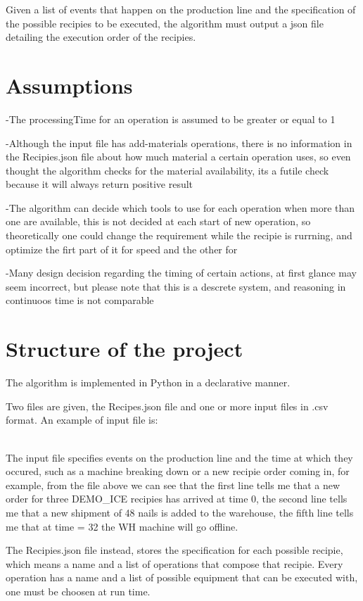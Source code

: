 \documentclass[12pt]{article}
\begin{document}
Given a list of events that happen on the production line and the specification of the possible recipies to be executed, the algorithm must output a json file detailing the execution order of the recipies.

\section{Assumptions}

-The processingTime for an operation is assumed to be greater or equal to 1

-Although the input file has add-materials operations, there is no information in the Recipies.json file about how much material a certain operation uses, so even thought the algorithm checks for the material availability, its a futile check because it will always return positive result

-The algorithm can decide which tools to use for each operation when more than one are available, this is not decided at each start of new operation, so theoretically one could change the requirement while the recipie is rurrning, and optimize the firt part of it for speed and the other for

-Many design decision regarding the timing of certain actions, at first glance may seem incorrect, but please note that this is a descrete system, and reasoning in continuoos time is not comparable

\section{Structure of the project}
The algorithm is implemented in Python in a declarative manner.

Two files are given, the Recipes.json file and one or more input files in .csv format.
An example of input file is:

\\

The input file specifies events on the production line and the time at which they occured, such as a machine breaking down or a new recipie order coming in, for example, from the file above we can see that the first line tells me that a new order for three DEMO\_ICE recipies has arrived at time 0, the second line tells me that a new shipment of 48 nails is added to the warehouse, the fifth line tells me that at time = 32 the WH machine will go offline.

The Recipies.json file instead, stores the specification for each possible recipie, which means a name and a list of operations that compose that recipie. Every operation has a name and a list of possible equipment that can be executed with, one must be choosen at run time.
\end{document}
